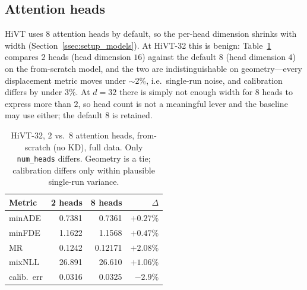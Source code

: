 \subsection{Attention heads}
\label{ssec:res_heads}
HiVT uses $8$ attention heads by default, so the per-head dimension shrinks with
width (Section~\ref{ssec:setup_models}). At HiVT-32 this is benign:
Table~\ref{tab:heads32} compares $2$ heads (head dimension $16$) against the
default $8$ (head dimension $4$) on the from-scratch model, and the two are
indistinguishable on geometry---every displacement metric moves under $\sim\!2\%$,
i.e.\ single-run noise, and calibration differs by under $3\%$. At $d{=}32$ there is simply not
enough width for $8$ heads to express more than $2$, so head count is not a
meaningful lever and the baseline may use either; the default $8$ is retained.

\begin{table}[htbp]
  \centering
  \caption{HiVT-32, $2$ vs.\ $8$ attention heads, from-scratch (no KD), full data.
    Only \texttt{num\_heads} differs. Geometry is a tie; calibration differs only
    within plausible single-run variance.}
  \label{tab:heads32}
  \begin{tabular}{lrrr}
    \toprule
    Metric & 2 heads & 8 heads & $\Delta$ \\
    \midrule
    minADE      & 0.7381 & 0.7361 & $+0.27\%$ \\
    minFDE      & 1.1622 & 1.1568 & $+0.47\%$ \\
    MR          & 0.1242 & 0.12171 & $+2.08\%$ \\
    mixNLL      & 26.891 & 26.610 & $+1.06\%$ \\
    calib.\ err & 0.0316 & 0.0325 & $-2.9\%$ \\
    \bottomrule
  \end{tabular}
\end{table}

